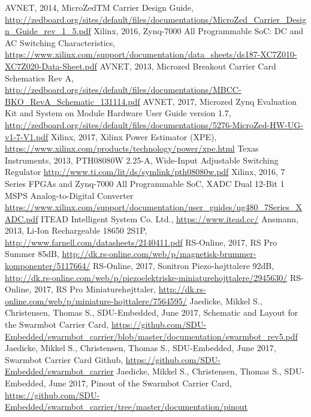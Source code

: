 \begin{thebibliography}{21} %
    AVNET, 2014, MicroZedTM Carrier Design Guide, \url{http://zedboard.org/sites/default/files/documentations/MicroZed_Carrier_Design_Guide_rev_1_5.pdf}
  	Xilinx, 2016, Zynq-7000 All Programmable SoC: DC and AC Switching Characteristics, \url{https://www.xilinx.com/support/documentation/data_sheets/ds187-XC7Z010-XC7Z020-Data-Sheet.pdf}
  	AVNET, 2013, Microzed Breakout Carrier Card Schematics Rev A, \url{http://zedboard.org/sites/default/files/documentations/MBCC-BKO_RevA_Schematic_131114.pdf}
  	AVNET, 2017, Microzed Zynq Evaluation Kit and System on Module Hardware User Guide version 1.7, \url{http://zedboard.org/sites/default/files/documentations/5276-MicroZed-HW-UG-v1-7-V1.pdf}
  	Xilinx, 2017, Xilinx Power Estimator (XPE), \url{https://www.xilinx.com/products/technology/power/xpe.html}
  	Texas Instruments, 2013, PTH08080W 2.25-A, Wide-Input Adjustable Switching Regulator \url{http://www.ti.com/lit/ds/symlink/pth08080w.pdf}
    Xilinx, 2016, 7 Series FPGAs and Zynq-7000 All Programmable SoC, XADC Dual 12-Bit 1 MSPS Analog-to-Digital Converter \url{https://www.xilinx.com/support/documentation/user_guides/ug480_7Series_XADC.pdf}
    ITEAD Intelligent System Co. Ltd., \url{https://www.itead.cc/}
    Ansmann, 2013, Li-Ion Rechargeable 18650 2S1P, \url{http://www.farnell.com/datasheets/2140411.pdf}
    RS-Online, 2017, RS Pro Summer 85dB, \url{http://dk.rs-online.com/web/p/magnetisk-brummer-komponenter/5117664/}
   RS-Online, 2017, Sonitron Piezo-højttalere 92dB, \url{http://dk.rs-online.com/web/p/piezoelektriske-miniaturehojttalere/2945630/}
   RS-Online, 2017, RS Pro Miniaturehøjttaler, \url{http://dk.rs-online.com/web/p/miniature-hojttalere/7564595/}
   Jaedicke, Mikkel S., Christensen, Thomas S., SDU-Embedded, June 2017, Schematic and Layout for the Swarmbot Carrier Card, \url{https://github.com/SDU-Embedded/swarmbot_carrier/blob/master/documentation/swarmbot_rev5.pdf} 
   Jaedicke, Mikkel S., Christensen, Thomas S., SDU-Embedded, June 2017, Swarmbot Carrier Card Github, \url{https://github.com/SDU-Embedded/swarmbot_carrier}
   Jaedicke, Mikkel S., Christensen, Thomas S., SDU-Embedded, June 2017, Pinout of the Swarmbot Carrier Card, \url{https://github.com/SDU-Embedded/swarmbot_carrier/tree/master/documentation/pinout}
\end{thebibliography}
